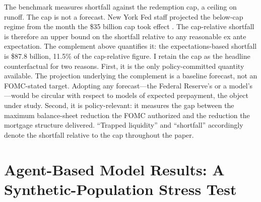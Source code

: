 \documentclass[12pt]{article}
\begin{document}
The benchmark measures shortfall against the redemption cap, a ceiling on runoff. The cap is not a forecast. New York Fed staff projected the below-cap regime from the month the \$35 billion cap took effect \citep{nyfed2022}. The cap-relative shortfall is therefore an upper bound on the shortfall relative to any reasonable ex ante expectation. The complement above quantifies it: the expectations-based shortfall is \$87.8 billion, 11.5\% of the cap-relative figure. I retain the cap as the headline counterfactual for two reasons. First, it is the only policy-committed quantity available. The projection underlying the complement is a baseline forecast, not an FOMC-stated target. Adopting any forecast---the Federal Reserve's or a model's---would be circular with respect to models of expected prepayment, the object under study. Second, it is policy-relevant: it measures the gap between the maximum balance-sheet reduction the FOMC authorized and the reduction the mortgage structure delivered. ``Trapped liquidity'' and ``shortfall'' accordingly denote the shortfall relative to the cap throughout the paper.
\section{Agent-Based Model Results: A Synthetic-Population Stress Test}\label{sec:abm}
\end{document}
